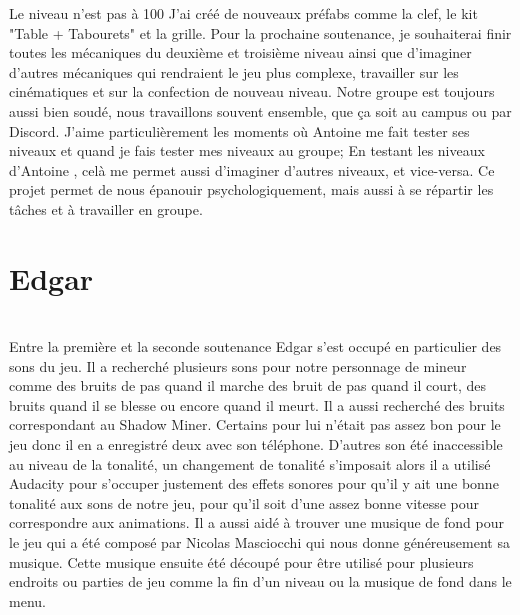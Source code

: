 \documentclass[titlepage, 13px, a4paper]{article}
\begin{document}
Le niveau n'est pas à 100%
J'ai créé de nouveaux préfabs comme la clef, le kit "Table + Tabourets" et la grille. Pour la prochaine soutenance, 
je souhaiterai finir toutes les mécaniques du deuxième et troisième niveau ainsi que d'imaginer d'autres mécaniques qui rendraient
 le jeu plus complexe, travailler sur les cinématiques et sur la confection de nouveau niveau. 
Notre groupe est toujours aussi bien soudé, nous travaillons souvent ensemble, que ça soit au campus ou par Discord. 
J'aime particulièrement les moments où Antoine me fait tester ses niveaux et quand je fais tester mes niveaux au groupe; 
En testant les niveaux d'Antoine , celà me permet aussi d'imaginer d'autres niveaux, et vice-versa. 
Ce projet permet de nous épanouir psychologiquement, mais aussi à se répartir les tâches et à travailler en groupe.

\newpage





\section{Edgar}
\paragraph{} \hspace{0pt} \\
Entre la première et la seconde soutenance Edgar s’est occupé en particulier des sons du jeu. 
Il a recherché plusieurs sons pour notre personnage de mineur comme des bruits de pas quand il marche des bruit de pas quand il court, 
des bruits quand il se blesse ou encore quand il meurt. Il a aussi recherché des bruits correspondant au Shadow Miner. 
Certains pour lui n’était pas assez bon pour le jeu donc il en a enregistré deux avec son téléphone. 
D’autres son été inaccessible au niveau de la tonalité, un changement de tonalité s'imposait alors il a utilisé Audacity pour 
s’occuper justement des effets sonores pour qu’il y ait une bonne tonalité aux sons de notre jeu, pour qu’il soit d’une assez bonne 
vitesse pour correspondre aux animations. Il a aussi aidé à trouver une musique de fond pour le jeu qui a été composé par Nicolas 
Masciocchi qui nous donne généreusement sa musique. Cette musique ensuite été découpé pour être utilisé pour plusieurs endroits ou 
parties de jeu comme la fin d’un niveau ou la musique de fond dans le menu. 
\end{document}
